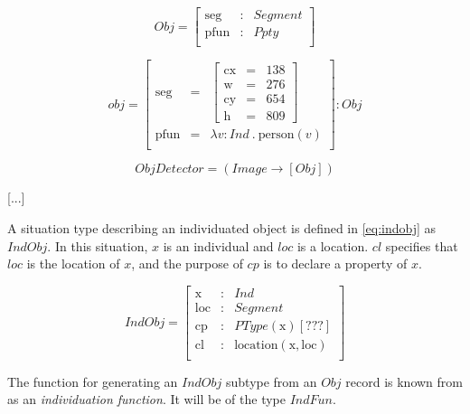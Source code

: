 \begin{equation}\label{eq:obj}
Obj = \left[\begin{array}{rcl}
\text{seg} &:& Segment\\
\text{pfun} &:& Ppty \\
\end{array}\right]\end{equation}

\begin{equation}\label{eq:objrec}
obj =
\left[\begin{array}{rcl}
\text{seg} &=& \left[\begin{array}{rcl}
\text{cx} &=& 138\\
\text{w} &=& 276\\
\text{cy} &=& 654\\
\text{h} &=& 809
\end{array}\right]\\
\text{pfun} &=& \lambda v:Ind\ .\ \text{person}(v)\\
\end{array}\right] : Obj\end{equation}

\begin{equation}\label{eq:objdetector}
ObjDetector = ( Image \rightarrow [Obj] )
\end{equation}

[...]

A situation type describing an individuated object is defined in \autoref{eq:indobj} as $IndObj$.
In this situation, $x$ is an individual and $loc$ is a location.
$cl$ specifies that $loc$ is the location of $x$, and the purpose of $cp$ is to declare a property of $x$.

\begin{equation}\label{eq:indobj}
IndObj = \left[\begin{array}{rcl}
\text{x} &:& Ind \\
\text{loc} &:& Segment \\
\text{cp} &:& PType(\text{x}) [???] \\
\text{cl} &:& \text{location}(\text{x}, \text{loc}) \\
\end{array}\right]
\end{equation}

The function for generating an $IndObj$ subtype from an $Obj$ record is known from \cite{lspc} as an \textit{individuation function}.
It will be of the type $IndFun$.

